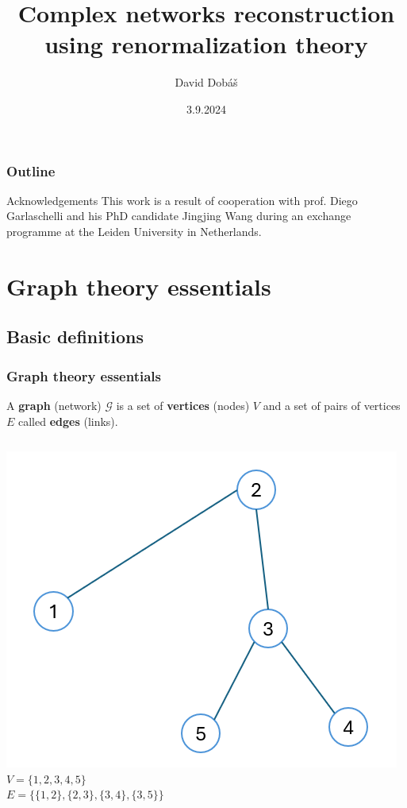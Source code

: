 \documentclass{beamer}
\title{Complex networks reconstruction using renormalization theory}
\author{David Dobáš}
\institute{FNSPE CTU, Prague}
\date{3.9.2024}
\begin{document}
\frame{\titlepage}

\begin{frame}
\frametitle{Outline}
\tableofcontents
\end{frame}

\begin{frame}{Acknowledgements}
    This work is a result of cooperation with prof. Diego Garlaschelli and his PhD candidate Jingjing Wang during an exchange programme at the Leiden University in Netherlands.
\end{frame}

\section{Graph theory essentials}
\subsection{Basic definitions}
\begin{frame}
\frametitle{Graph theory essentials}
A \textbf{graph} (network) $\mathcal{G}$ is a set of \textbf{vertices} (nodes) $V$ and a set of pairs of vertices $E$ called \textbf{edges} (links).

\begin{columns}
             \centering
             \includegraphics[scale=0.38]{img/undir_graph.PNG}
              $V = \{1,2,3,4,5\}$ \\
              $E = \{\{1,2\}, \{2,3\},\{3,4\},\{3,5\}\}$
         \end{columns} 

\end{frame}
\end{document}
